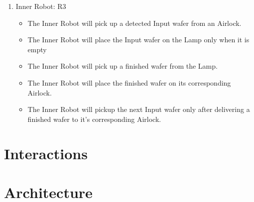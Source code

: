 \documentclass[a4paper,12pt]{article}
\begin{document}
\begin{enumerate}
\item Inner Robot: R3
	\begin{itemize}
	\item The Inner Robot will pick up a detected Input wafer from an Airlock.
	\item The Inner Robot will place the Input wafer on the Lamp only when it is empty
	\item The Inner Robot will pick up a finished wafer from the Lamp.
	\item The Inner Robot will place the finished wafer on its corresponding Airlock.
	\item The Inner Robot will pickup the next Input wafer only after delivering a finished wafer to it's corresponding Airlock.
	\end{itemize}

\end{enumerate}

\section{Interactions} 

\section{Architecture}
\end{document}
